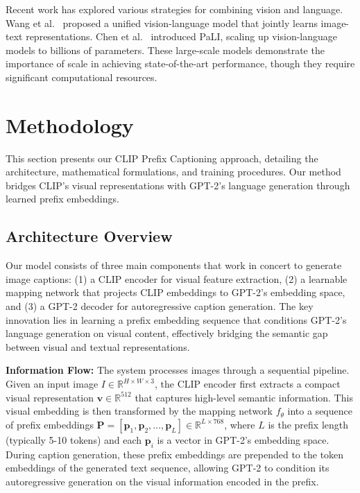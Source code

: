 \documentclass[runningheads]{llncs}
\begin{document}
Recent work has explored various strategies for combining vision and language. Wang et al.~\cite{wang2022image} proposed a unified vision-language model that jointly learns image-text representations. Chen et al.~\cite{chen2022pali} introduced PaLI, scaling up vision-language models to billions of parameters. These large-scale models demonstrate the importance of scale in achieving state-of-the-art performance, though they require significant computational resources.

\section{Methodology}

This section presents our CLIP Prefix Captioning approach, detailing the architecture, mathematical formulations, and training procedures. Our method bridges CLIP's visual representations with GPT-2's language generation through learned prefix embeddings.

\subsection{Architecture Overview}

Our model consists of three main components that work in concert to generate image captions: (1) a CLIP encoder for visual feature extraction, (2) a learnable mapping network that projects CLIP embeddings to GPT-2's embedding space, and (3) a GPT-2 decoder for autoregressive caption generation. The key innovation lies in learning a prefix embedding sequence that conditions GPT-2's language generation on visual content, effectively bridging the semantic gap between visual and textual representations.

\textbf{Information Flow:} The system processes images through a sequential pipeline. Given an input image $I \in \mathbb{R}^{H \times W \times 3}$, the CLIP encoder first extracts a compact visual representation $\mathbf{v} \in \mathbb{R}^{512}$ that captures high-level semantic information. This visual embedding is then transformed by the mapping network $f_\theta$ into a sequence of prefix embeddings $\mathbf{P} = [\mathbf{p}_1, \mathbf{p}_2, \ldots, \mathbf{p}_L] \in \mathbb{R}^{L \times 768}$, where $L$ is the prefix length (typically 5-10 tokens) and each $\mathbf{p}_i$ is a vector in GPT-2's embedding space. During caption generation, these prefix embeddings are prepended to the token embeddings of the generated text sequence, allowing GPT-2 to condition its autoregressive generation on the visual information encoded in the prefix.
\end{document}
